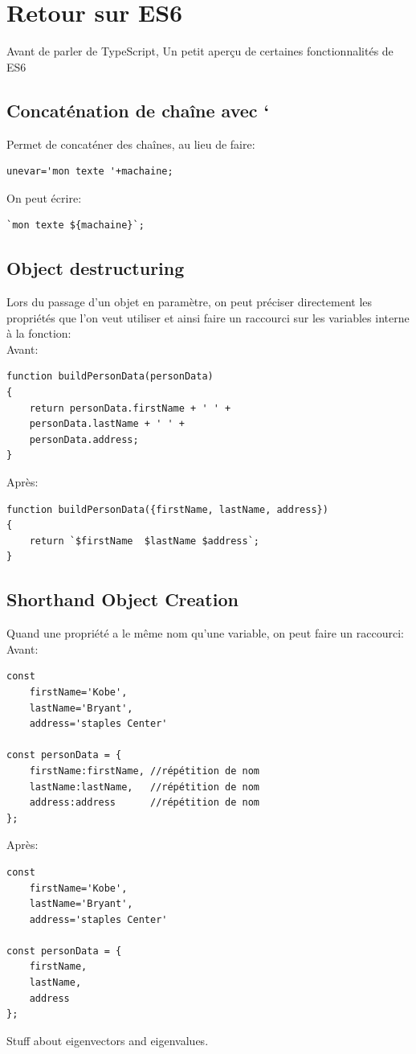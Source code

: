 \documentclass[12pt,oneside]{scrbook}
\begin{document}
\chapter{Retour sur ES6} 
Avant de parler de TypeScript, Un petit aperçu de certaines fonctionnalités de ES6
\section{Concaténation de chaîne avec `}
Permet de concaténer des chaînes, au lieu de faire:

\begin{verbatim}
unevar='mon texte '+machaine;
\end{verbatim}
On peut écrire:
\begin{verbatim}
`mon texte ${machaine}`;
\end{verbatim}

\section{Object destructuring}
Lors du passage d'un objet en paramètre, on peut préciser directement les propriétés que l'on veut utiliser et ainsi faire un raccourci sur les variables interne à la fonction:\\
Avant:
\begin{verbatim}
function buildPersonData(personData)
{
    return personData.firstName + ' ' +
    personData.lastName + ' ' +
    personData.address;
}
\end{verbatim}
Après:
\begin{verbatim}
function buildPersonData({firstName, lastName, address})
{
    return `$firstName  $lastName $address`;
}
\end{verbatim}
\section{Shorthand Object Creation}
Quand une propriété a le même nom qu'une variable, on peut faire un raccourci:\\
Avant:
\begin{verbatim}
const 
    firstName='Kobe',
    lastName='Bryant',
    address='staples Center'

const personData = {
    firstName:firstName, //répétition de nom
    lastName:lastName,   //répétition de nom
    address:address      //répétition de nom
};
\end{verbatim}
Après:
\begin{verbatim}
const 
    firstName='Kobe',
    lastName='Bryant',
    address='staples Center'

const personData = {
    firstName,
    lastName,
    address
};
\end{verbatim}
Stuff about eigenvectors and 
eigenvalues. 
\end{document}
